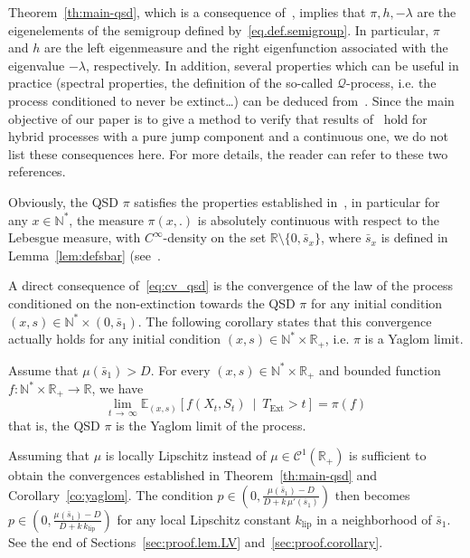 \documentclass[AHL,Unicode,longabstracts,published]{cedram}
\newcommand{\RR}{\mathbb{R}}
\newcommand{\NN}{\mathbb{N}}
\newcommand{\EE}{\mathbb{E}}
\newcommand{\clC}{\mathcal{C}}
\newcommand{\clQ}{\mathcal{Q}}
\newcommand{\klip}{k_{\text{lip}}}
\newcommand{\Text}{T_{\mathrm{Ext}}}
\newcommand{\1}{\mathbf{1}}
\begin{document}
Theorem~\ref{th:main-qsd}, which is a consequence of~\cite{CV20,BCGM}, implies that $\pi, h, -\lambda$ are the eigenelements of the semigroup defined by~\eqref{eq.def.semigroup}. In particular, $\pi$ and $h$ are the left eigenmeasure and the right eigenfunction associated with the eigenvalue $-\lambda$, respectively. In addition, several properties which can be useful in practice (spectral properties, the definition of the so-called $\clQ$-process, i.e. the process conditioned to never be extinct\dots\!) can be deduced from~\cite{BCGM,CV20}. Since the main objective of our paper is to give a method to verify that results of~\cite{BCGM,CV20} hold for hybrid processes with a pure jump component and a continuous one, we do not list these consequences here. For more details, the reader can refer to these two references.


Obviously, the QSD $\pi$ satisfies the properties established in~\cite{CMMS}, in particular for any $x\in \NN^*$, the measure $\pi(x,.)$ is absolutely continuous with respect to the Lebesgue measure, with $C^\infty$-density on the set $\RR\setminus\{0,\bar s_x\}$, where $\bar s_x$ is defined in Lemma~\ref{lem:defsbar} (see~\cite[Proposition~5.1]{CMMS}.



A direct consequence of~\eqref{eq:cv_qsd} is the convergence of the law of the process conditioned on the non-extinction towards the QSD $\pi$ for any initial condition $(x,s)\in \NN^*\times (0, \bar s_1)$. The following corollary states that this convergence actually holds for any initial condition $(x,s)\in \NN^* \times \RR_+$, i.e. $\pi$ is a Yaglom limit.

\begin{coro}\label{co:yaglom}
Assume that $\mu(\bar s_1)>D$. For every $(x,s) \in \NN^* \times \RR_+$ and bounded function $f:\NN^*\times \RR_+\to \RR$, we have
\[
\lim_{t\,\to\,\infty} \EE_{(x,s)} \left[f(X_t,S_t) \ \middle| \ \Text>t\right] = \pi(f)
\]
that is, the QSD $\pi$ is the Yaglom limit of the process.
\end{coro}



\begin{rema}\label{remark:mu.lipschitz}
Assuming that $\mu$ is locally Lipschitz instead of $\mu\in \clC^1(\RR_+)$ is sufficient to obtain the convergences established in Theorem~\ref{th:main-qsd} and Corollary~\ref{co:yaglom}. The condition $p\in(0,\frac{\mu(\bar s_1)-D}{D+k\,\mu'(\bar s_1)})$ then becomes $p\in(0,\frac{\mu(\bar s_1)-D}{D+k\,\klip})$ for any local Lipschitz constant $\klip$ in a neighborhood of $\bar s_1$. See the end of Sections~\ref{sec:proof.lem.LV} and~\ref{sec:proof.corollary}.
\end{rema}
\end{document}
